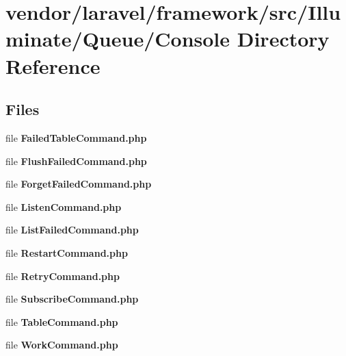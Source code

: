 \section{vendor/laravel/framework/src/\+Illuminate/\+Queue/\+Console Directory Reference}
\label{dir_1ca3460fe3a5c1927262f0ba3c54a330}
\subsection*{Files}
\begin{DoxyCompactItemize}
\item 
file {\bf Failed\+Table\+Command.\+php}
\item 
file {\bf Flush\+Failed\+Command.\+php}
\item 
file {\bf Forget\+Failed\+Command.\+php}
\item 
file {\bf Listen\+Command.\+php}
\item 
file {\bf List\+Failed\+Command.\+php}
\item 
file {\bf Restart\+Command.\+php}
\item 
file {\bf Retry\+Command.\+php}
\item 
file {\bf Subscribe\+Command.\+php}
\item 
file {\bf Table\+Command.\+php}
\item 
file {\bf Work\+Command.\+php}
\end{DoxyCompactItemize}
